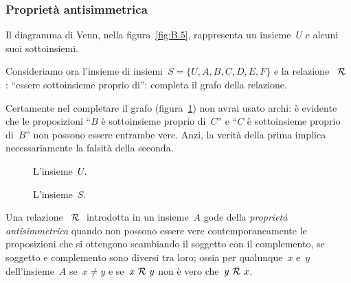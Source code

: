 
\subsubsection{Proprietà antisimmetrica}

 \begin{esempio}

Il diagramma di Venn, nella figura~\ref{fig:B.5}, rappresenta un insieme~\(U\) 
e 
alcuni suoi sottoinsiemi.

Consideriamo ora l'insieme di insiemi~\(S = \lbrace U, A, B, C, D, E, F 
\rbrace\) 
e la relazione~\(~\mathcal{R}~\): ``essere sottoinsieme proprio di'':
completa il grafo della relazione.

Certamente nel completare il grafo (figura~\ref{fig:B.6}) non avrai usato 
archi: 
è evidente che le proposizioni ``\(B\) è sottoinsieme proprio di~\(C\)'' e 
``\(C\)
è sottoinsieme proprio di~\(B\)'' non possono essere entrambe vere. Anzi, la 
verità della prima implica necessariamente la falsità della seconda.
 \end{esempio}

\begin{inaccessibleblock}
 \begin{figure}[b]
\begin{minipage}[b]{.45\textwidth}
%  
\begin{center} \sottoinsiemi \end{center}
 \caption{L'insieme~\(U\).}\label{fig:B.5}
\end{minipage}\hfil
\begin{minipage}[b]{.45\textwidth}
\begin{center} \relsottoinsieme \end{center}
%  
 \caption{L'insieme~\(S\).}\label{fig:B.6}
\end{minipage}
\end{figure}
\end{inaccessibleblock}

\begin{definizione}
Una relazione~\(~\mathcal{R}~\) introdotta in un insieme~\(A\) gode della 
\emph{proprietà 
antisimmetrica} quando non possono essere vere
contemporaneamente le proposizioni che si ottengono scambiando il soggetto con 
il complemento, se soggetto e complemento sono diversi
tra loro; ossia per qualunque~\(x\) e~\(y\) dell'insieme~\(A\) se~\(x \neq y\) 
e 
se~\(x 
~\mathcal{R}~ y\) non è vero che~\(y ~\mathcal{R}~ x\).
\end{definizione}

